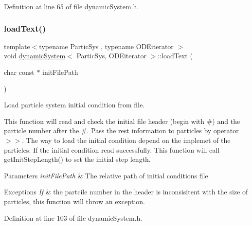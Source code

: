 Definition at line 65 of file dynamic\+System.\+h.

\mbox{\label{classdynamic_system_a3ff4342241733e94edce17c1a79a90a8}} 
\subsubsection{\texorpdfstring{load\+Text()}{loadText()}}
{\footnotesize\ttfamily template$<$typename Partic\+Sys , typename O\+D\+Eiterator $>$ \\
void \mbox{\hyperlink{classdynamic_system}{dynamic\+System}}$<$ Partic\+Sys, O\+D\+Eiterator $>$\+::load\+Text (\begin{DoxyParamCaption}\item[{char const $\ast$}]{init\+File\+Path }\end{DoxyParamCaption})}



Load particle system initial condition from file. 

This function will read and check the initial file header (begin with \textquotesingle{}\#\textquotesingle{}) and the particle number after the \textquotesingle{}\#\textquotesingle{}. Pass the rest information to particles by operator \textquotesingle{}$>$$>$\textquotesingle{}. The way to load the initial condition depend on the implemet of the particles. If the initial condition read successfully. This function will call get\+Init\+Step\+Length() to set the initial step length.


\begin{DoxyParams}{Parameters}
{\em init\+File\+Path} & The relative path of initial conditions file \\
\hline
\end{DoxyParams}

\begin{DoxyExceptions}{Exceptions}
{\em If} & the partcile number in the header is inconsisitent with the size of particles, this function will throw an exception. \\
\hline
\end{DoxyExceptions}


Definition at line 103 of file dynamic\+System.\+h.

